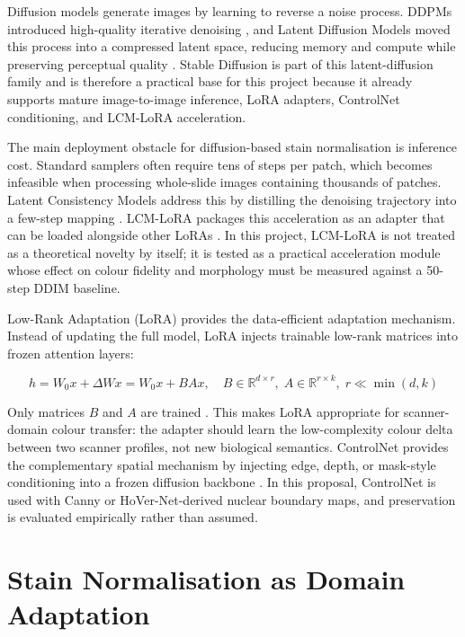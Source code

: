 \documentclass[a4paper,twoside,12pt]{report}
\begin{document}
Diffusion models generate images by learning to reverse a noise process. DDPMs introduced high-quality iterative denoising \citep{ho2020ddpm}, and Latent Diffusion Models moved this process into a compressed latent space, reducing memory and compute while preserving perceptual quality \citep{rombach2022ldm}. Stable Diffusion is part of this latent-diffusion family and is therefore a practical base for this project because it already supports mature image-to-image inference, LoRA adapters, ControlNet conditioning, and LCM-LoRA acceleration.

The main deployment obstacle for diffusion-based stain normalisation is inference cost. Standard samplers often require tens of steps per patch, which becomes infeasible when processing whole-slide images containing thousands of patches. Latent Consistency Models address this by distilling the denoising trajectory into a few-step mapping \citep{luo2023lcm}. LCM-LoRA packages this acceleration as an adapter that can be loaded alongside other LoRAs \citep{luo2023lcmlora}. In this project, LCM-LoRA is not treated as a theoretical novelty by itself; it is tested as a practical acceleration module whose effect on colour fidelity and morphology must be measured against a 50-step DDIM baseline.

Low-Rank Adaptation (LoRA) provides the data-efficient adaptation mechanism. Instead of updating the full model, LoRA injects trainable low-rank matrices into frozen attention layers:

\begin{equation}
h = W_0 x + \Delta W x = W_0 x + BAx,
\quad B \in \mathbb{R}^{d \times r},\; A \in \mathbb{R}^{r \times k},\; r \ll \min(d,k)
\label{eq:lora}
\end{equation}

Only matrices $B$ and $A$ are trained \citep{hu2021lora}. This makes LoRA appropriate for scanner-domain colour transfer: the adapter should learn the low-complexity colour delta between two scanner profiles, not new biological semantics. ControlNet provides the complementary spatial mechanism by injecting edge, depth, or mask-style conditioning into a frozen diffusion backbone \citep{zhang2023controlnet}. In this proposal, ControlNet is used with Canny or HoVer-Net-derived nuclear boundary maps, and preservation is evaluated empirically rather than assumed.

\section{Stain Normalisation as Domain Adaptation}
\label{sec:stainnorm}
\end{document}
